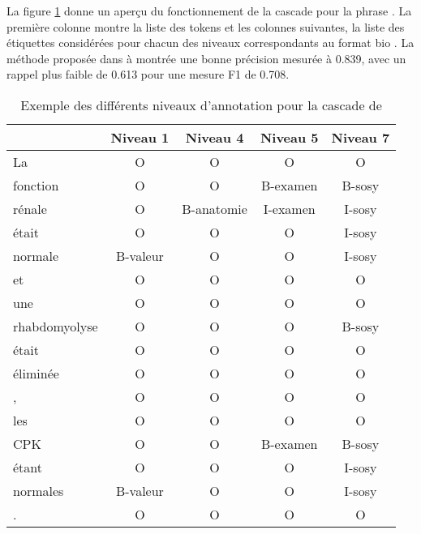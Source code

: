 La figure \ref{tab:tal:cascade} donne un aperçu du fonctionnement de la cascade pour la phrase .
La première colonne montre la liste des tokens et les colonnes suivantes, la liste des étiquettes considérées pour chacun des niveaux correspondants au format \gls{bio} \cite{ramshawTextChunkingUsing1995}.
La méthode proposée dans \cite{minardDOINGDEFTCascade2020} à montrée une bonne précision mesurée à \num{0.839}, avec un rappel plus faible de \num{0.613} pour une mesure F1 de \num{0.708}.

\begin{table}[htb]
    \centering
    \begin{tabular}{l|cccc}
                      & Niveau 1 & Niveau 4   & Niveau 5 & Niveau 7 \\
        \hline
        \hline
        La            & O        & O          & O        & O        \\
        fonction      & O        & O          & B-examen & B-sosy   \\
        rénale        & O        & B-anatomie & I-examen & I-sosy   \\
        était         & O        & O          & O        & I-sosy   \\
        normale       & B-valeur & O          & O        & I-sosy   \\
        et            & O        & O          & O        & O        \\
        une           & O        & O          & O        & O        \\
        rhabdomyolyse & O        & O          & O        & B-sosy   \\
        était         & O        & O          & O        & O        \\
        éliminée      & O        & O          & O        & O        \\
        ,             & O        & O          & O        & O        \\
        les           & O        & O          & O        & O        \\
        CPK           & O        & O          & B-examen & B-sosy   \\
        étant         & O        & O          & O        & I-sosy   \\
        normales      & B-valeur & O          & O        & I-sosy   \\
        .             & O        & O          & O        & O
    \end{tabular}
    \caption{Exemple des différents niveaux d'annotation pour la cascade de }
    \label{tab:tal:cascade}
\end{table}

